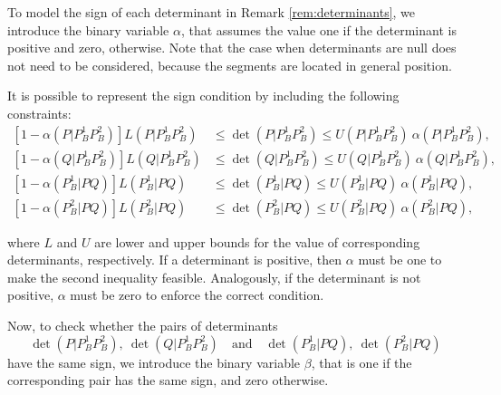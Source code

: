 \documentclass[a4paper,  review, authoryear, 1p.]{elsarticle}
\newcommand{\determinant}[3]{\det({#1|#2#3})}
\begin{document}
		\newcommand{\LS}[3]{L(#1|#2#3)}
		\newcommand{\US}[3]{U(#1|#2#3)}
		\newcommand{\alphamas}[3]{\alpha(#1|#2#3)}
		\newcommand{\alphamenos}[3]{\alpha^{-}(#1|#2#3)}
		\newcommand{\alphapunto}[3]{\alpha^{\cdotp}(#1|#2#3)}
		
		To model the sign of each determinant in Remark \ref{rem:determinants}, we introduce the binary variable $\alpha$, that assumes the value one if the determinant is positive and zero, otherwise. Note that the case when determinants are null does not need to be considered, because the segments are located in general position.
		
		It is possible to represent the sign condition by including the following constraints:
		\begin{align*}\tag{$\alpha$-C}\label{eq:alphaC}
			\left[1-\alphamas{P}{P_B^1}{P_B^2}\right]\LS{P}{P_B^1}{P_B^2}&\leq\determinant{P}{P_B^1}{P_B^2}\leq \US{P}{P_B^1}{P_B^2}\:\alphamas{P}{P_B^1}{P_B^2},\\
			\left[1-\alphamas{Q}{P_B^1}{P_B^2}\right]\LS{Q}{P_B^1}{P_B^2}&\leq\determinant{Q}{P_B^1}{P_B^2}\leq \US{Q}{P_B^1}{P_B^2}\:\alphamas{Q}{P_B^1}{P_B^2},\\
			\left[1-\alphamas{P_B^1}{P}{Q}\right]\LS{P_B^1}{P}{Q}&\leq\determinant{P_B^1}{P}{Q}\leq \US{P_B^1}{P}{Q}\:\alphamas{P_B^1}{P}{Q},\\		\left[1-\alphamas{P_B^2}{P}{Q}\right]\LS{P_B^2}{P}{Q}&\leq\determinant{P_B^2}{P}{Q}\leq \US{P_B^2}{P}{Q}\:\alphamas{P_B^2}{P}{Q},
		\end{align*}
		
		\noindent where $L$ and $U$ are lower and upper bounds for the value of corresponding determinants, respectively. If a determinant is positive, then $\alpha$ must be one to make the second inequality feasible. Analogously, if the determinant is not positive, $\alpha$ must be zero to enforce the correct condition.
		
		\newcommand{\betamas}[4]{\beta(#1#2|#3#4)}
		
		Now, to check whether the pairs of determinants 
		\begin{equation}\label{eq:pair}
			\determinant{P}{P_B^1}{P_B^2},\: \determinant{Q}{P_B^1}{P_B^2}\quad \text{and} \quad \determinant{P_B^1}{P}{Q},\:	 \determinant{P_B^2}{P}{Q}
		\end{equation} 
		have the same sign, we introduce the binary variable $\beta$, that is one if the corresponding pair has the same sign, and zero otherwise.
		
\end{document}
